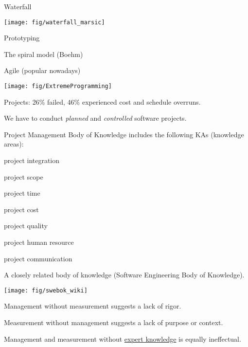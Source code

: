 \documentclass[landscape,30pt]{foils}
\begin{document}
Waterfall

\begin{center}
\texttt{[image: fig/waterfall\_marsic]}
\end{center}

Prototyping

The spiral model (Boehm)

Agile (popular nowadays)

\begin{center}
\texttt{[image: fig/ExtremeProgramming]}
\end{center}


Projects: 26\% failed, 46\% experienced cost and schedule overruns.

We have to conduct {\em planned} and {\em controlled} software projects.


Project Management Body of Knowledge includes the following KAs (knowledge areas):

project integration

project scope

project time

project cost

project quality

project human resource

project communication



A closely related body of knowledge (Software Engineering Body of Knowledge).

\begin{center}
\texttt{[image: fig/swebok\_wiki]}
\end{center}



Management without measurement suggests a lack of rigor.

Measurement without management suggests a lack of purpose or context.

Management and measurement without \underline{expert knowledge} is equally ineffectual.
\end{document}
